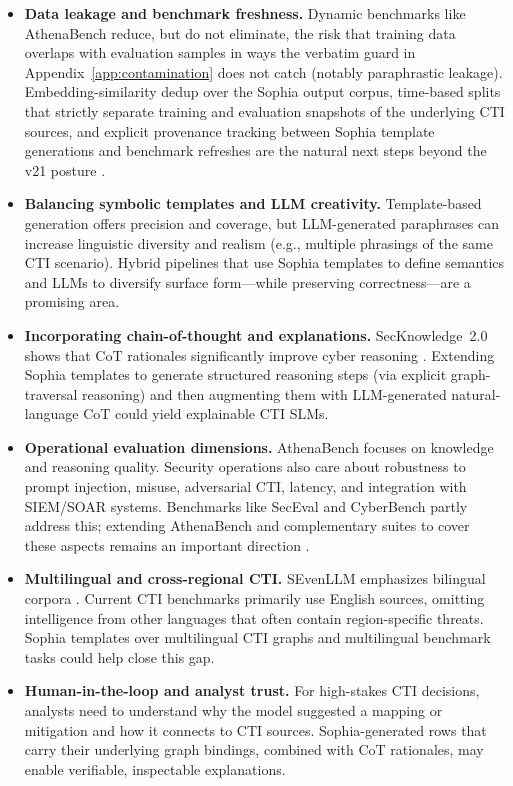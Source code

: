 \documentclass[webpdf,contemporary,large]{oup-authoring-template}
\theoremstyle{thmstyleone}
\theoremstyle{thmstyletwo}
\theoremstyle{thmstylethree}
\begin{document}
\begin{itemize}
  \item \textbf{Data leakage and benchmark freshness.} Dynamic benchmarks like AthenaBench reduce, but do not eliminate, the risk that training data overlaps with evaluation samples in ways the verbatim guard in Appendix~\ref{app:contamination} does not catch (notably paraphrastic leakage). Embedding-similarity dedup over the Sophia output corpus, time-based splits that strictly separate training and evaluation snapshots of the underlying CTI sources, and explicit provenance tracking between Sophia template generations and benchmark refreshes are the natural next steps beyond the v21 posture \cite{alam2025athenabench,cardei2025ift}.
  \item \textbf{Balancing symbolic templates and LLM creativity.} Template-based generation offers precision and coverage, but LLM-generated paraphrases can increase linguistic diversity and realism (e.g., multiple phrasings of the same CTI scenario). Hybrid pipelines that use Sophia templates to define semantics and LLMs to diversify surface form---while preserving correctness---are a promising area.
  \item \textbf{Incorporating chain-of-thought and explanations.} SecKnowledge~2.0 shows that CoT rationales significantly improve cyber reasoning \cite{levi2025toward}. Extending Sophia templates to generate structured reasoning steps (via explicit graph-traversal reasoning) and then augmenting them with LLM-generated natural-language CoT could yield explainable CTI SLMs.
  \item \textbf{Operational evaluation dimensions.} AthenaBench focuses on knowledge and reasoning quality. Security operations also care about robustness to prompt injection, misuse, adversarial CTI, latency, and integration with SIEM/SOAR systems. Benchmarks like SecEval and CyberBench partly address this; extending AthenaBench and complementary suites to cover these aspects remains an important direction \cite{hu2024seceval,liu2024cyberbench,alam2025athenabench}.
  \item \textbf{Multilingual and cross-regional CTI.} SEvenLLM emphasizes bilingual corpora \cite{ji2024sevenllm}. Current CTI benchmarks primarily use English sources, omitting intelligence from other languages that often contain region-specific threats. Sophia templates over multilingual CTI graphs and multilingual benchmark tasks could help close this gap.
  \item \textbf{Human-in-the-loop and analyst trust.} For high-stakes CTI decisions, analysts need to understand why the model suggested a mapping or mitigation and how it connects to CTI sources. Sophia-generated rows that carry their underlying graph bindings, combined with CoT rationales, may enable verifiable, inspectable explanations.
\end{itemize}
\end{document}
